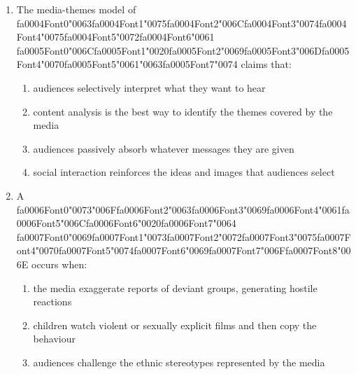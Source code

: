 \documentclass[12pt]{article}
\begin{document}
\begin{enumerate}[label=\arabic*.]
\begin{enumerate}[label=(\alph*)]
    \item both boys and girls being closely attached to their fathers, but girls breaking away
\end{enumerate}
\item The media-themes model of {\csname fa0004Font0\endcsname\char"0063}{\csname fa0004Font1\endcsname\char"0075}{\csname fa0004Font2\endcsname\char"006C}{\csname fa0004Font3\endcsname\char"0074}{\csname fa0004Font4\endcsname\char"0075}{\csname fa0004Font5\endcsname\char"0072}{\csname fa0004Font6\endcsname\char"0061} {\csname fa0005Font0\endcsname\char"006C}{\csname fa0005Font1\endcsname\char"0020}{\csname fa0005Font2\endcsname\char"0069}{\csname fa0005Font3\endcsname\char"006D}{\csname fa0005Font4\endcsname\char"0070}{\csname fa0005Font5\endcsname\char"0061}{\char"0063}{\csname fa0005Font7\endcsname\char"0074} claims that:
\begin{enumerate}[label=(\alph*)]
    \item audiences selectively interpret what they want to hear
    \item content analysis is the best way to identify the themes covered by the media
    \item audiences passively absorb whatever messages they are given
    \item social interaction reinforces the ideas and images that audiences select
\end{enumerate}
\item A {\csname fa0006Font0\endcsname\char"0073}{\char"006F}{\csname fa0006Font2\endcsname\char"0063}{\csname fa0006Font3\endcsname\char"0069}{\csname fa0006Font4\endcsname\char"0061}{\csname fa0006Font5\endcsname\char"006C}{\csname fa0006Font6\endcsname\char"0020}{\csname fa0006Font7\endcsname\char"0064} {\csname fa0007Font0\endcsname\char"0069}{\csname fa0007Font1\endcsname\char"0073}{\csname fa0007Font2\endcsname\char"0072}{\csname fa0007Font3\endcsname\char"0075}{\csname fa0007Font4\endcsname\char"0070}{\csname fa0007Font5\endcsname\char"0074}{\csname fa0007Font6\endcsname\char"0069}{\csname fa0007Font7\endcsname\char"006F}{\csname fa0007Font8\endcsname\char"006E} occurs when:
\begin{enumerate}[label=(\alph*)]
    \item the media exaggerate reports of deviant groups, generating hostile reactions
    \item children watch violent or sexually explicit films and then copy the behaviour
    \item audiences challenge the ethnic stereotypes represented by the media

\end{enumerate}
\end{enumerate}
\end{document}
